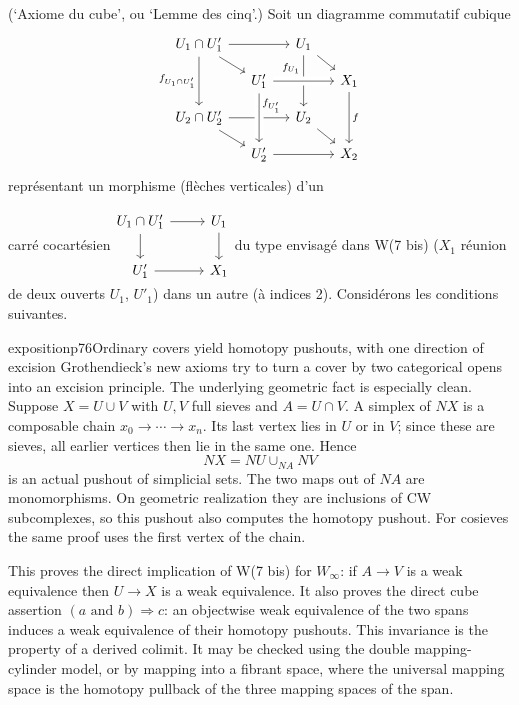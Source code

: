 \begin{description}[leftmargin=5em, style=sameline]
\item[W(7)] (`Axiome du cube', ou `Lemme des cinq'.) Soit un diagramme commutatif cubique
\[
\begin{tikzcd}[row sep=small, column sep=small]
U_1\cap U'_1 \arrow[rr] \arrow[dr] \arrow[dd, "f_{U_1\cap U'_1}"'] & & U_1 \arrow[dr] \arrow[dd, "f_{U_1}"{swap,pos=.25}] & \\
& U'_1 \arrow[rr, crossing over] & & X_1 \arrow[dd, "f"] \\
U_2\cap U'_2 \arrow[rr] \arrow[dr] & & U_2 \arrow[dr] & \\
& U'_2 \arrow[rr] \arrow[from=uu, crossing over, "f_{U'_1}"{pos=.25}] & & X_2
\end{tikzcd}
\]
représentant un morphisme (flèches verticales) d'un

carré cocartésien\quad $\vcenter{\hbox{\begin{tikzcd}
U_1\cap U'_1 \arrow[r] \arrow[d] & U_1 \arrow[d] \\
U'_1 \arrow[r] & X_1
\end{tikzcd}}}$\quad du type envisagé dans W(7 bis) ($X_1$ réunion de deux ouverts $U_1$, $U'_1$) dans un autre (à indices 2). Considérons les conditions suivantes.

\begin{dcomment}{exposition}{p76}{Ordinary covers yield homotopy pushouts, with one direction of excision}
Grothendieck's new axioms try to turn a cover by two categorical opens into an excision principle. The underlying geometric fact is especially clean. Suppose $X=U\cup V$ with $U,V$ full sieves and $A=U\cap V$. A simplex of $NX$ is a composable chain $x_0\to\cdots\to x_n$. Its last vertex lies in $U$ or in $V$; since these are sieves, all earlier vertices then lie in the same one. Hence
\[
 NX=NU\cup_{NA}NV
\]
is an actual pushout of simplicial sets. The two maps out of $NA$ are monomorphisms. On geometric realization they are inclusions of CW subcomplexes, so this pushout also computes the homotopy pushout. For cosieves the same proof uses the first vertex of the chain.

This proves the direct implication of W(7 bis) for $W_\infty$: if $A\to V$ is a weak equivalence then $U\to X$ is a weak equivalence. It also proves the direct cube assertion $(a\text{ and }b)\Rightarrow c$: an objectwise weak equivalence of the two spans induces a weak equivalence of their homotopy pushouts. This invariance is the property of a derived colimit. It may be checked using the double mapping-cylinder model, or by mapping into a fibrant space, where the universal mapping space is the homotopy pullback of the three mapping spaces of the span.


\end{dcomment}
\end{description}
